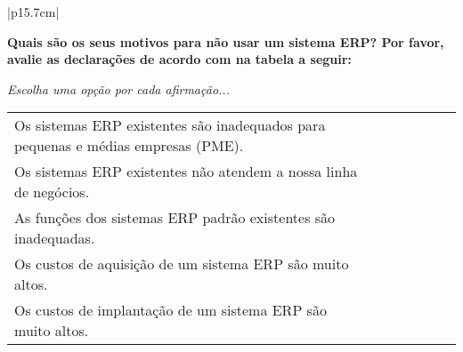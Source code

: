 \begin{longtable}{|p{15.7cm}|}
	\begin{Spacing}{0.8} \end{Spacing}
	\begin{Spacing}{0.8} 
		\textbf{Quais são os seus motivos para não usar um sistema ERP? Por favor, avalie as declarações de acordo com na tabela a seguir:} \end{Spacing} 
	\begin{Spacing}{2.0} 
	\tiny \textit{Escolha uma opção por cada afirmação...} \end{Spacing} 
	\begin{Spacing}{2.0} \end{Spacing}
	\tiny \begin{tabularx}{15.7 cm}{|X|X|X|X|X|X|X|}
		\hline
		& {\rotatebox[origin=c]{90}{\parbox[c]{2.5cm}{\centering \textcolor{white}{.}\newline \medskip Concordo Completamente}}} 
		& {\rotatebox[origin=c]{90}{\parbox[c]{2.5cm}{\centering \textcolor{white}{.}\newline \medskip Concordo Parcialmente}}} 
		& {\rotatebox[origin=c]{90}{\parbox[c]{2.5cm}{\centering \textcolor{white}{.}\newline \medskip Não Concordo \newline Nem Discordo}}}	 
		& {\rotatebox[origin=c]{90}{\parbox[c]{2.5cm}{\centering \textcolor{white}{.}\newline \medskip Discordo  Parcialmente }}} 
		& {\rotatebox[origin=c]{90}{\parbox[c]{2.5cm}{\centering \textcolor{white}{.}\newline \medskip Discordo  Completamente  }}}
		& {\rotatebox[origin=c]{90}{\parbox[c]{2.5cm}{\centering \textcolor{white}{.}\newline  \textcolor{white}{.}\newline Eu Não Sei }}} \\
		\hline
		Os sistemas ERP existentes são inadequados para pequenas e médias empresas (PME). &   &   &   &   &   &  \\
		\hline
		Os sistemas ERP existentes não atendem a nossa linha de negócios. &   &   &   &   &   &  \\
		\hline
		As funções dos sistemas ERP padrão existentes são inadequadas. &   &   &   &   &   &  \\
		\hline
		Os custos de aquisição de um sistema ERP são muito altos. &   &   &   &   &   &  \\
		\hline
		Os custos de implantação de um sistema ERP são muito altos. &   &   &   &   &   &  \\

\end{tabularx}
\end{longtable}
